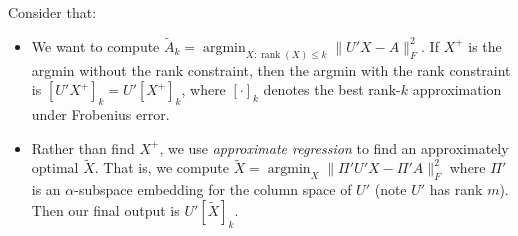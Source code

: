 \documentclass[11pt]{article}
\begin{document}
Consider that:

\begin{itemize}
\item We want to compute $\tilde{A}_k = \mathop{argmin}_{X : \mathop{rank}(X) \le k} \|U'X - A\|_F^2$. If $X^+$ is the argmin without the rank constraint, then the argmin with the rank constraint is $[U'X^+]_k = U'[X^+]_k$, where $[\cdot]_k$ denotes the best rank-$k$ approximation under Frobenius error.
\item Rather than find $X^+$, we use {\em approximate regression} to find an approximately optimal $\tilde{X}$. That is, we compute $\tilde{X} = \mathop{argmin}_X \|\Pi' U' X - \Pi' A\|_F^2$ where $\Pi'$ is an $\alpha$-subspace embedding for the column space of $U'$ (note $U'$ has rank $m$). Then our final output is $U'[\tilde{X}]_k$.
\end{itemize}
\end{document}
